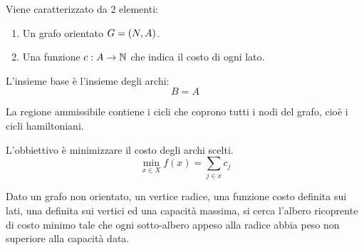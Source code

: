 \documentclass[\main/main.tex]{subfiles}
\begin{document}
\begin{multicols}{2}
\begin{problem}
        Viene caratterizzato da 2 elementi:
        \begin{enumerate}
            \item Un grafo orientato \(G = \left(N, A\right)\).
            \item Una funzione \(c: A \rightarrow \mathbb{N}\) che indica il costo di ogni lato.
        \end{enumerate}
    \end{problem}
    \begin{definition}
        L'insieme base è l'insieme degli archi:
        \[
            B = A
        \]
    \end{definition}
    \begin{definition}
        La regione ammissibile contiene i cicli che coprono tutti i nodi del grafo, cioè i cicli hamiltoniani.
    \end{definition}
    \begin{definition}
        L'obbiettivo è minimizzare il costo degli archi scelti.
        \[
            \min_{x \in X} f(x) = \sum_{j \in x} c_j
        \]
    \end{definition}
    \begin{problem}
        Dato un grafo non orientato, un vertice radice, una funzione costo definita sui lati, una definita sui vertici ed una capacità massima, si cerca l'albero ricoprente di costo minimo tale che ogni sotto-albero appeso alla radice abbia peso non superiore alla capacità data.
        

\end{problem}
\end{multicols}
\end{document}
